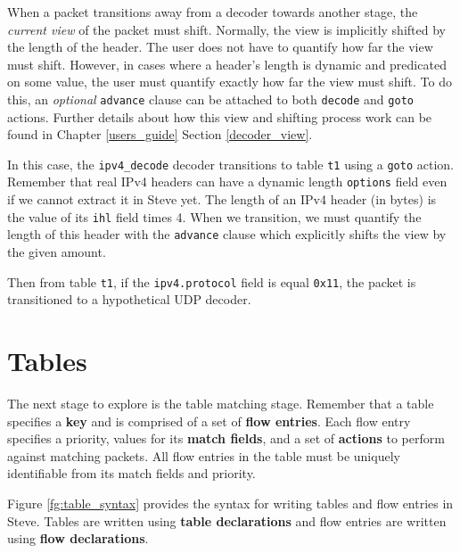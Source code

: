 When a packet transitions away from a decoder towards another stage, the \textit{current view} of the packet must shift. Normally, the view is implicitly shifted by the length of the header. The user does not have to quantify how far the view must shift. However, in cases where a header's length is dynamic and predicated on some value, the user must quantify exactly how far the view must shift. To do this, an \textit{optional} \texttt{advance} clause can be attached to both \texttt{decode} and \texttt{goto} actions. Further details about how this view and shifting process work can be found in Chapter \ref{users_guide} Section \ref{decoder_view}.

In this case, the \texttt{ipv4\_decode} decoder transitions to table \texttt{t1} using a \texttt{goto} action. Remember that real IPv4 headers can have a dynamic length \texttt{options} field even if we cannot extract it in Steve yet. The length of an IPv4 header (in bytes) is the value of its \texttt{ihl} field times 4. When we transition, we must quantify the length of this header with the \texttt{advance} clause which explicitly shifts the view by the given amount.

Then from table \texttt{t1}, if the \texttt{ipv4.protocol} field is equal \texttt{0x11}, the packet is transitioned to a hypothetical UDP decoder.

\section{Tables} \label{table_tut}

The next stage to explore is the table matching stage. Remember that a table specifies a \textbf{key} and is comprised of a set of \textbf{flow entries}. Each flow entry specifies a priority, values for its \textbf{match fields}, and a set of \textbf{actions} to perform against matching packets. All flow entries in the table must be uniquely identifiable from its match fields and priority.

Figure \ref{fg:table_syntax} provides the syntax for writing tables and flow entries in Steve. Tables are written using \textbf{table declarations} and flow entries are written using \textbf{flow declarations}.

